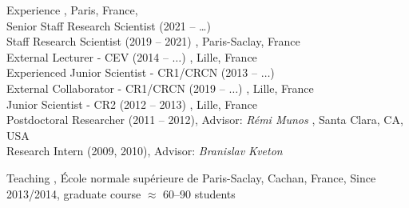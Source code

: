 \documentclass{resume}
\begin{document}
\maketitle




\begin{category}{Experience}
, Paris, France, \\
Senior Staff Research Scientist (2021 -- \dots) \\
Staff Research Scientist (2019 -- 2021) 
, Paris-Saclay, France \\
External Lecturer - CEV (2014 -- $\dots$)
, Lille, France \\
Experienced Junior Scientist - CR1/CRCN (2013 -- $\dots$) \\
External Collaborator - CR1/CRCN (2019 -- $\dots$) 
, Lille, France \\
Junior Scientist - CR2 (2012 -- 2013)
, Lille, France \\
Postdoctoral Researcher (2011 -- 2012), Advisor:  \emph{R\'emi Munos}
,  Santa Clara, CA, USA\\
Research Intern (2009, 2010), Advisor:  \emph{Branislav Kveton}
\begin{category}{Teaching}
,  %
\' Ecole normale sup\' erieure de Paris-Saclay, Cachan, France, 
Since 2013/2014,  graduate course $\approx$ 60--90 students
\end{category}
\end{category}
\end{document}

